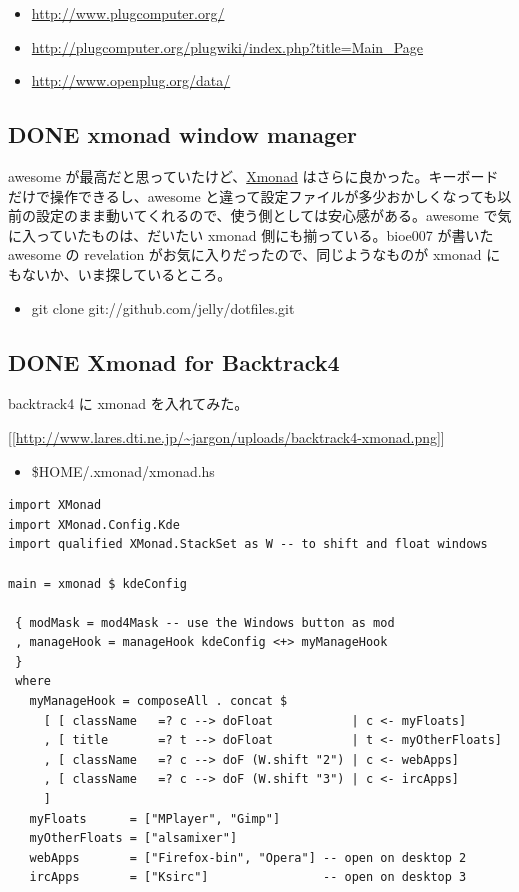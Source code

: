 \documentclass[11pt]{article}
\begin{document}
\begin{itemize}
\item \url{http://www.plugcomputer.org/}
\item \url{http://plugcomputer.org/plugwiki/index.php?title=Main\_Page}
\item \url{http://www.openplug.org/data/}
\end{itemize}
\subsection{{\bfseries\sffamily DONE} xmonad window manager}
\label{sec:org4922057}
awesome が最高だと思っていたけど、\href{http://xmonad.org/}{Xmonad} はさらに良かった。キーボードだけで操作できるし、awesome と違って設定ファイルが多少おかしくなっても以前の設定のまま動いてくれるので、使う側としては安心感がある。awesome で気に入っていたものは、だいたい xmonad 側にも揃っている。bioe007 が書いた awesome の revelation がお気に入りだったので、同じようなものが xmonad にもないか、いま探しているところ。

\begin{itemize}
\item git clone git://github.com/jelly/dotfiles.git
\end{itemize}
\subsection{{\bfseries\sffamily DONE} Xmonad for Backtrack4}
\label{sec:org20a848b}
backtrack4 に xmonad を入れてみた。

\href{http://www.lares.dti.ne.jp/\~jargon/uploads/backtrack4-xmonad.png}{{[}[http://www.lares.dti.ne.jp/\textasciitilde{}jargon/uploads/backtrack4-xmonad.png}]]

\begin{itemize}
\item \$HOME/.xmonad/xmonad.hs
\end{itemize}

\begin{verbatim}
import XMonad
import XMonad.Config.Kde
import qualified XMonad.StackSet as W -- to shift and float windows

main = xmonad $ kdeConfig

 { modMask = mod4Mask -- use the Windows button as mod
 , manageHook = manageHook kdeConfig <+> myManageHook
 }
 where
   myManageHook = composeAll . concat $
     [ [ className   =? c --> doFloat           | c <- myFloats]
     , [ title       =? t --> doFloat           | t <- myOtherFloats]
     , [ className   =? c --> doF (W.shift "2") | c <- webApps]
     , [ className   =? c --> doF (W.shift "3") | c <- ircApps]
     ]
   myFloats      = ["MPlayer", "Gimp"]
   myOtherFloats = ["alsamixer"]
   webApps       = ["Firefox-bin", "Opera"] -- open on desktop 2
   ircApps       = ["Ksirc"]                -- open on desktop 3
\end{verbatim}
\end{document}
